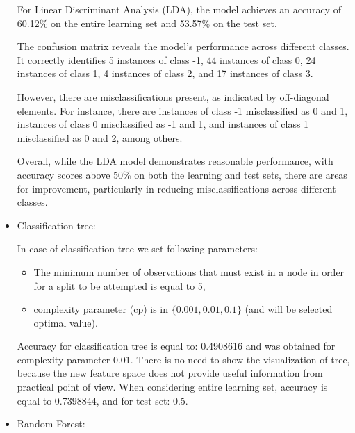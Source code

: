 \documentclass[11pt,a4paper]{article}\usepackage[]{graphicx}\usepackage[]{xcolor}
\begin{document}
\begin{itemize}
	 	
	 
	 For Linear Discriminant Analysis (LDA), the model achieves an accuracy of 60.12\% on the entire learning set and 53.57\% on the test set.

The confusion matrix reveals the model's performance across different classes. It correctly identifies 5 instances of class -1, 44 instances of class 0, 24 instances of class 1, 4 instances of class 2, and 17 instances of class 3.

However, there are misclassifications present, as indicated by off-diagonal elements. For instance, there are instances of class -1 misclassified as 0 and 1, instances of class 0 misclassified as -1 and 1, and instances of class 1 misclassified as 0 and 2, among others.

Overall, while the LDA model demonstrates reasonable performance, with accuracy scores above 50\% on both the learning and test sets, there are areas for improvement, particularly in reducing misclassifications across different classes.
	 	
	 	\item Classification tree:
	 	
	 	In case of classification tree we set following parameters:
	 	\begin{itemize}
	 		\item The minimum number of observations that must exist in a node in order for a split
	 		to be attempted is equal to 5,
	 		\item complexity parameter (cp) is in $\{0.001, 0.01, 0.1\}$ (and will be selected optimal value).
	 	\end{itemize}
	 	

	 	

	 	
	 	Accuracy for classification tree is equal to: 0.4908616 and was obtained for complexity parameter 0.01. There is no need to show the visualization of tree, because the new feature space does not provide useful information from practical point of view.\newline
	 	When considering entire learning set, accuracy is equal to 0.7398844, and for test set: 0.5.
	 	
	 	\item Random Forest:
	 	


\end{itemize}
\end{document}
